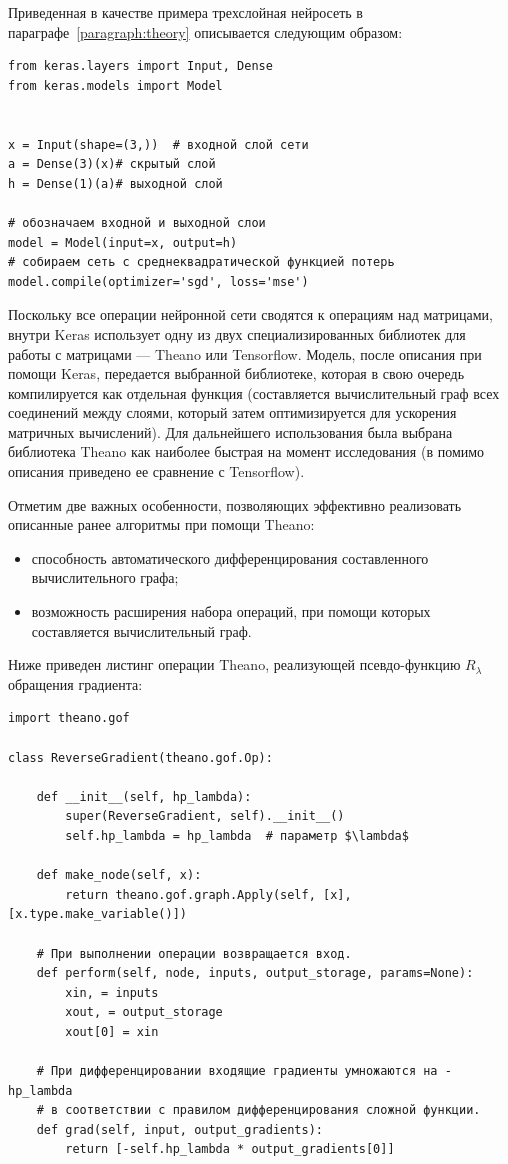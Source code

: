 \documentclass[14pt, a4paper]{extarticle}
\begin{document}
Приведенная в качестве примера трехслойная нейросеть в параграфе~\ref{paragraph:theory} описывается следующим образом:
\begin{verbatim}
from keras.layers import Input, Dense
from keras.models import Model


x = Input(shape=(3,))  # входной слой сети
a = Dense(3)(x)# скрытый слой
h = Dense(1)(a)# выходной слой

# обозначаем входной и выходной слои
model = Model(input=x, output=h)
# собираем сеть с среднеквадратической функцией потерь
model.compile(optimizer='sgd', loss='mse')
\end{verbatim}

Поскольку все операции нейронной сети сводятся к операциям над матрицами, внутри Keras использует одну из двух специализированных библиотек для работы с матрицами — Theano или Tensorflow. Модель, после описания при помощи Keras, передается выбранной библиотеке, которая в свою очередь компилируется как отдельная функция (составляется вычислительный граф всех соединений между слоями, который затем оптимизируется для ускорения матричных вычислений). Для дальнейшего использования была выбрана библиотека Theano \cite{theano} как наиболее быстрая на момент исследования (в \cite{theano} помимо описания приведено ее сравнение с Tensorflow).

Отметим две важных особенности, позволяющих эффективно реализовать описанные ранее алгоритмы при помощи Theano:
\begin{itemize}
	\item способность автоматического дифференцирования составленного вычислительного графа;
	\item возможность расширения набора операций, при помощи которых составляется вычислительный граф. 
\end{itemize} 

Ниже приведен листинг операции Theano, реализующей псевдо-функцию $R_{\lambda}$ обращения градиента:
\begin{verbatim}
import theano.gof

class ReverseGradient(theano.gof.Op):

    def __init__(self, hp_lambda):
        super(ReverseGradient, self).__init__()
        self.hp_lambda = hp_lambda  # параметр $\lambda$

    def make_node(self, x):
        return theano.gof.graph.Apply(self, [x], [x.type.make_variable()])

    # При выполнении операции возвращается вход.
    def perform(self, node, inputs, output_storage, params=None):
        xin, = inputs
        xout, = output_storage
        xout[0] = xin

    # При дифференцировании входящие градиенты умножаются на -hp_lambda
    # в соответствии с правилом дифференцирования сложной функции.
    def grad(self, input, output_gradients):
        return [-self.hp_lambda * output_gradients[0]]
\end{verbatim}
\end{document}
